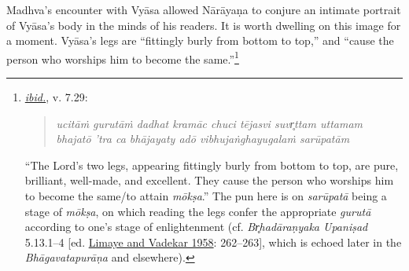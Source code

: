 Madhva’s encounter with Vyāsa allowed Nārāyaṇa to conjure an intimate portrait of Vyāsa’s body in the minds of his readers. It is worth dwelling on this image for a moment. Vyāsa’s legs are “fittingly burly from bottom to top,” and “cause the person who worships him to become the same.”\footnote{%
\hyperref[NarayanaPandita2017]{\emph{ibid.}}, v. 7.29:\setlength{\parindent}{2em}

\vspace{-1.5ex}\begin{quote}\raggedright
      \emph{ucitāṁ gurutāṁ dadhat kramāc chuci tējasvi suvr̥ttam uttamam}\\
\emph{bhajatō ’tra ca bhājayaty adō vibhujaṅghayugalaṁ sarūpatām}\end{quote}\vspace{-1.5ex}
      

\noindent{}“The Lord’s two legs, appearing fittingly burly from bottom to top, are pure, brilliant, well-made, and excellent. They cause the person who worships him to become the same/to attain \emph{mōkṣa}.” The pun here is on \emph{sarūpatā} being a stage of \emph{mōkṣa}, on which reading the legs confer the appropriate \emph{gurutā} according to one’s stage of enlightenment (cf. \emph{{Br̥hadāraṇyaka Upaniṣad}} 5.13.1–4 [ed. \hyperref[LimayeVadekar]{Limaye and Vadekar 1958}: 262–263], which is echoed later in the \emph{{Bhāgavatapurāṇa}} and elsewhere).
}
